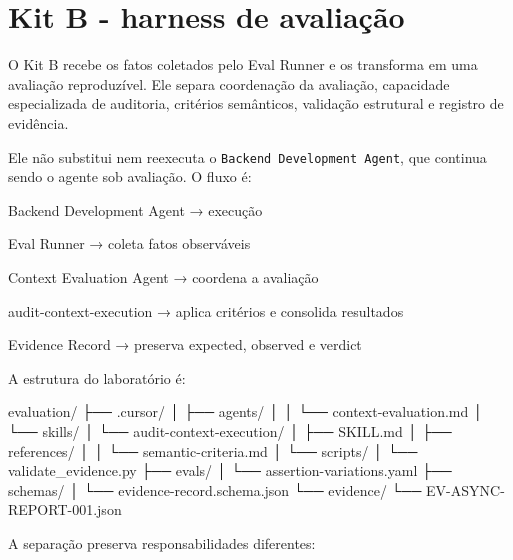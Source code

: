 \documentclass[
  10pt,
  a4paper,
  oneside]{book}
\newenvironment{Shaded}{}{}
\newcommand{\NormalTok}[1]{#1}
\renewenvironment{Shaded}{\begin{snugshade}}{\end{snugshade}}%
\begin{document}
\hypertarget{kit-b---harness-de-avaliauxe7uxe3o}{%
\section{Kit B - harness de
avaliação}\label{kit-b---harness-de-avaliauxe7uxe3o}}

O Kit B recebe os fatos coletados pelo Eval Runner e os transforma em
uma avaliação reproduzível. Ele separa coordenação da avaliação,
capacidade especializada de auditoria, critérios semânticos, validação
estrutural e registro de evidência.

Ele não substitui nem reexecuta o \texttt{Backend\ Development\ Agent},
que continua sendo o agente sob avaliação. O fluxo é:

\begin{Shaded}
\begin{Highlighting}[]
\NormalTok{Backend Development Agent}
\NormalTok{→ execução}

\NormalTok{Eval Runner}
\NormalTok{→ coleta fatos observáveis}

\NormalTok{Context Evaluation Agent}
\NormalTok{→ coordena a avaliação}

\NormalTok{audit{-}context{-}execution}
\NormalTok{→ aplica critérios e consolida resultados}

\NormalTok{Evidence Record}
\NormalTok{→ preserva expected, observed e verdict}
\end{Highlighting}
\end{Shaded}

A estrutura do laboratório é:

\begin{Shaded}
\begin{Highlighting}[]
\NormalTok{evaluation/}
\NormalTok{├── .cursor/}
\NormalTok{│   ├── agents/}
\NormalTok{│   │   └── context{-}evaluation.md}
\NormalTok{│   └── skills/}
\NormalTok{│       └── audit{-}context{-}execution/}
\NormalTok{│           ├── SKILL.md}
\NormalTok{│           ├── references/}
\NormalTok{│           │   └── semantic{-}criteria.md}
\NormalTok{│           └── scripts/}
\NormalTok{│               └── validate\_evidence.py}
\NormalTok{├── evals/}
\NormalTok{│   └── assertion{-}variations.yaml}
\NormalTok{├── schemas/}
\NormalTok{│   └── evidence{-}record.schema.json}
\NormalTok{└── evidence/}
\NormalTok{    └── EV{-}ASYNC{-}REPORT{-}001.json}
\end{Highlighting}
\end{Shaded}

A separação preserva responsabilidades diferentes:
\end{document}
